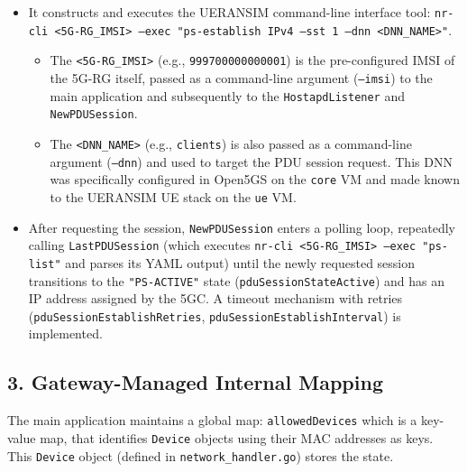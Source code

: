 \begin{itemize}
    \item{ 
        It constructs and executes the UERANSIM command-line interface tool: \texttt{nr-cli <5G-RG\_IMSI> --exec "ps-establish IPv4 --sst 1 --dnn <DNN\_NAME>"}.
        \begin{itemize}
            \item The \texttt{<5G-RG\_IMSI>} (e.g., \texttt{999700000000001}) is the pre-configured \ac{IMSI} of the \ac{5G-RG} itself, passed as a command-line argument (\texttt{--imsi}) to the main application and subsequently to the \texttt{HostapdListener} and \texttt{NewPDUSession}.
            \item The \texttt{<DNN\_NAME>} (e.g., \texttt{clients}) is also passed as a command-line argument (\texttt{--dnn}) and used to target the \ac{PDU} session request. This \ac{DNN} was specifically configured in Open5GS on the \texttt{core} \ac{VM} and made known to the UERANSIM \ac{UE} stack on the \texttt{ue} \ac{VM}.
        \end{itemize}
    }
    \item After requesting the session, \texttt{NewPDUSession} enters a polling loop, repeatedly calling \texttt{LastPDUSession} (which executes \texttt{nr-cli <5G-RG\_IMSI> --exec "ps-list"} and parses its YAML output) until the newly requested session transitions to the \texttt{"PS-ACTIVE"} state (\texttt{pduSessionStateActive}) and has an \ac{IP} address assigned by the \ac{5GC}. A timeout mechanism with retries (\texttt{pduSessionEstablishRetries}, \texttt{pduSessionEstablishInterval}) is implemented.
\end{itemize}

\subsection{3. Gateway-Managed Internal Mapping}

The main application maintains a global map: \texttt{allowedDevices} which is a key-value map, that identifies \texttt{Device} objects using their \ac{MAC} addresses as keys. This \texttt{Device} object (defined in \texttt{network\_handler.go}) stores the state.

